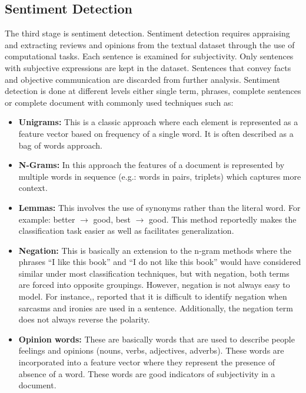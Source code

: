 \subsection{Sentiment Detection}
The third stage is sentiment detection. Sentiment detection requires appraising and
extracting reviews and opinions from the textual dataset through the use of computational
tasks. Each sentence is examined for subjectivity. Only sentences with subjective
expressions are kept in the dataset. Sentences that convey facts and objective
communication are discarded from further analysis. Sentiment detection is done at different
levels either single term, phrases, complete sentences or complete document with
commonly used techniques such as:


\begin{itemize}

\item \textbf{Unigrams:} This is a classic approach where each element is represented as a feature
vector based on frequency of a single word. It is often described as a bag of words
approach.

\item \textbf{N-Grams:} In this approach the features of a document is represented by multiple words
in sequence (e.g.: words in pairs, triplets) which captures more context.

\item \textbf{Lemmas:} This involves the use of synonyms rather than the literal word. For example:
better $\xrightarrow{}$ good, best $\xrightarrow{}$ good. This method reportedly makes the classification task easier as well as facilitates generalization.

\item \textbf{Negation:} This is basically an extension to the n-gram methods where the phrases “I
like this book” and “I do not like this book” would have considered similar under most
classification techniques, but with negation, both terms are forced into opposite
groupings. However, negation is not always easy to model.
For instance,\cite{ref19}, reported that it is difficult to identify negation when
sarcasms and ironies are used in a sentence. Additionally, the negation term does not
always reverse the polarity.

\item \textbf{Opinion words:} These are basically words that are used to describe people feelings and
opinions (nouns, verbs, adjectives, adverbs). These words are incorporated into a
feature vector where they represent the presence of absence of a word. These words
are good indicators of subjectivity in a document.
\end{itemize}

